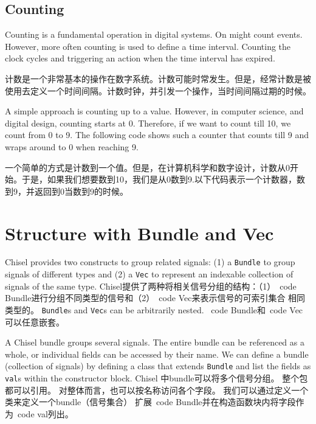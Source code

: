 \documentclass[%
    10pt,
    headinclude, footexclude,
    openright, %
    notitlepage,
    cleardoubleempty,
    headsepline,
    pointlessnumbers,
    bibtotoc, idxtotoc,
    ]{scrbook}
\newcommand{\code}[1]{{\small{\texttt{#1}}}}
\begin{document}
\subsection{Counting}

Counting is a fundamental operation in digital systems. On might count events.
However, more often counting is used to define a time interval. Counting the
clock cycles and triggering an action when the time interval has expired.

计数是一个非常基本的操作在数字系统。计数可能时常发生。但是，经常计数是被使用去定义一个时间间隔。计数时钟，并引发一个操作，当时间间隔过期的时候。


A simple approach is counting up to a value. However, in computer science,
and digital design, counting starts at 0. Therefore, if we want to count till
10, we count from 0 to 9. The following code shows such a counter that counts
till 9 and wraps around to 0 when reaching 9.

一个简单的方式是计数到一个值。但是，在计算机科学和数字设计，计数从0开始。于是，如果我们想要数到10，我们是从0数到9.以下代码表示一个计数器，数到9，并返回到0当数到9的时候。



\section{Structure with Bundle and Vec}

Chisel provides two constructs to group related signals: (1) a \code{Bundle} to group
signals of different types and (2) a \code{Vec} to represent an indexable collection of signals
of the same type.
Chisel提供了两种将相关信号分组的结构：（1）\ code {Bundle}进行分组不同类型的信号和（2）\ code {Vec}来表示信号的可索引集合
相同类型的。
\code{Bundle}s and \code{Vec}s can be arbitrarily nested.
\ code {Bundle}和\ code {Vec}可以任意嵌套。

A Chisel bundle groups several signals. The entire bundle can be referenced
as a whole, or individual fields can be accessed by their name.
We can define a bundle (collection of signals) by defining a class that
extends \code{Bundle} and list the fields as \code{val}s within the constructor block.
Chisel 中bundle可以将多个信号分组。 整个包都可以引用。
对整体而言，也可以按名称访问各个字段。
我们可以通过定义一个类来定义一个bundle（信号集合）
扩展\ code {Bundle}并在构造函数块内将字段作为\ code {val}列出。


\end{document}
